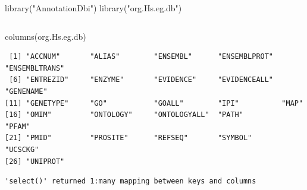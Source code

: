 \documentclass[
  letterpaper,
  DIV=11,
  numbers=noendperiod]{scrartcl}
\newenvironment{Shaded}{\begin{snugshade}}{\end{snugshade}}
\newcommand{\AttributeTok}[1]{\textcolor[rgb]{0.40,0.45,0.13}{#1}}
\newcommand{\FunctionTok}[1]{\textcolor[rgb]{0.28,0.35,0.67}{#1}}
\newcommand{\NormalTok}[1]{\textcolor[rgb]{0.00,0.23,0.31}{#1}}
\newcommand{\OtherTok}[1]{\textcolor[rgb]{0.00,0.23,0.31}{#1}}
\newcommand{\SpecialCharTok}[1]{\textcolor[rgb]{0.37,0.37,0.37}{#1}}
\newcommand{\StringTok}[1]{\textcolor[rgb]{0.13,0.47,0.30}{#1}}
\begin{document}
\begin{Shaded}
\begin{Highlighting}[]
\FunctionTok{library}\NormalTok{(}\StringTok{"AnnotationDbi"}\NormalTok{)}
\FunctionTok{library}\NormalTok{(}\StringTok{"org.Hs.eg.db"}\NormalTok{)}
\end{Highlighting}
\end{Shaded}

\begin{verbatim}
\end{verbatim}

\begin{Shaded}
\begin{Highlighting}[]
\FunctionTok{columns}\NormalTok{(org.Hs.eg.db)}
\end{Highlighting}
\end{Shaded}

\begin{verbatim}
 [1] "ACCNUM"       "ALIAS"        "ENSEMBL"      "ENSEMBLPROT"  "ENSEMBLTRANS"
 [6] "ENTREZID"     "ENZYME"       "EVIDENCE"     "EVIDENCEALL"  "GENENAME"    
[11] "GENETYPE"     "GO"           "GOALL"        "IPI"          "MAP"         
[16] "OMIM"         "ONTOLOGY"     "ONTOLOGYALL"  "PATH"         "PFAM"        
[21] "PMID"         "PROSITE"      "REFSEQ"       "SYMBOL"       "UCSCKG"      
[26] "UNIPROT"     
\end{verbatim}

\begin{Shaded}
\end{Shaded}

\begin{verbatim}
'select()' returned 1:many mapping between keys and columns
\end{verbatim}

\begin{Shaded}
\end{Shaded}
\end{document}
